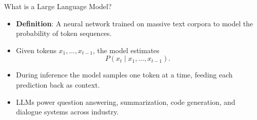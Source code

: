 \documentclass[aspectratio=169]{beamer}
\begin{document}
\begin{frame}{What is a Large Language Model?}
  \begin{itemize}
    \item \textbf{Definition}: A neural network trained on massive text corpora to model the probability of token sequences.
    \item Given tokens $x_1, \dots, x_{t-1}$, the model estimates
      \[
        P(x_t \mid x_1, \dots, x_{t-1}).
      \]
    \item During inference the model samples one token at a time, feeding each prediction back as context.
    \item LLMs power question answering, summarization, code generation, and dialogue systems across industry.
  \end{itemize}
\end{frame}
\end{document}
